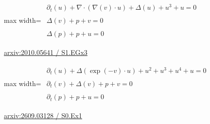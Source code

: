 \documentclass[UTF8,10pt,a4paper,fontset=mac]{ctexart}
\begin{document}
\begin{minipage}{\linewidth}\begin{center}\begin{adjustbox}{max width=\linewidth}$\displaystyle\begin{gathered}\begin{gathered}\partial_{t}(u)+\nabla\cdot(\nabla(v)\cdot u)+\Delta(u)+u^{3}+u=0\end{gathered}\\[5pt]\begin{gathered}\Delta(v)+p+v=0\end{gathered}\\[5pt]\begin{gathered}\Delta(p)+p+u=0\end{gathered}\end{gathered}$\end{adjustbox}\end{center}{\small\href{https://arxiv.org/html/2010.05641#S1.EGx3}{arxiv:2010.05641 / S1.EGx3}}\par\end{minipage}\par\vspace{6mm}

\begin{minipage}{\linewidth}\begin{center}\begin{adjustbox}{max width=\linewidth}$\displaystyle\begin{gathered}\begin{gathered}\partial_{t}(u)+\Delta(\exp(-v)\cdot u)+u^{2}+u^{3}+u^{4}+u=0\end{gathered}\\[5pt]\begin{gathered}\partial_{t}(v)+\Delta(v)+p+v=0\end{gathered}\\[5pt]\begin{gathered}\partial_{t}(p)+p+u=0\end{gathered}\end{gathered}$\end{adjustbox}\end{center}{\small\href{https://arxiv.org/html/2609.03128#S0.Ex1}{arxiv:2609.03128 / S0.Ex1}}\par\end{minipage}\par\vspace{6mm}
\end{document}
